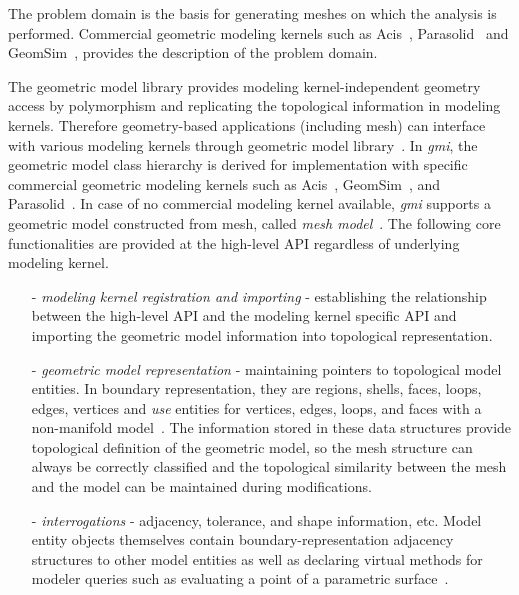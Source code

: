 The problem domain is the basis for generating meshes on 
which the analysis is performed. 
Commercial geometric modeling kernels such as Acis~\cite{acisweb}, 
Parasolid~\cite{parasolidweb} and GeomSim~\cite{geomsimweb}, provides the
description of the problem domain.

The geometric model library provides modeling 
kernel-independent geometry access by polymorphism and 
replicating the topological information 
 in modeling kernels. Therefore geometry-based applications 
(including mesh) can interface with various modeling 
kernels through geometric model library~\cite{vgi97,cgm01,beall-geom04}. 
In \emph{gmi}, the geometric 
model class hierarchy is derived for implementation with specific commercial 
geometric modeling kernels such as Acis~\cite{acisweb}, GeomSim~\cite{geomsimweb}, and 
Parasolid~\cite{parasolidweb}. In case of no 
commercial modeling kernel available, \emph{gmi} supports a geometric model 
constructed from mesh, called \emph{mesh model}~\cite{beall-geom04}.
The following core functionalities are provided at the high-level API 
regardless of underlying modeling kernel.


\begin{enumerate}
\item[-] \emph{modeling kernel registration and importing} - 
establishing the relationship between the high-level API 
and the modeling kernel specific API and importing 
the geometric model information into topological representation.
\item[-] \emph{geometric model representation} - maintaining pointers to 
topological model entities. In boundary representation, they are regions, 
shells, faces, loops, edges, vertices and \emph{use} entities for vertices, 
edges, loops, and faces with a non-manifold model~\cite{weiler88}. The 
information stored in these data structures provide topological definition of 
the geometric model, so the mesh structure can always be correctly classified 
and the topological similarity between the mesh and the model can be maintained 
during modifications.
\item[-] \emph{interrogations} - adjacency, tolerance, and shape information, 
etc. Model entity objects themselves contain boundary-representation adjacency 
structures to other model entities as well as declaring virtual methods for 
modeler queries such as evaluating a point of a parametric
surface~\cite{beall-geom04}.
\end{enumerate}

